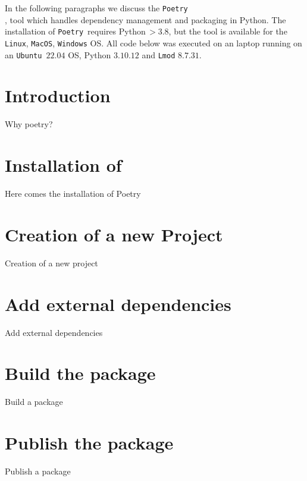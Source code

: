 \documentclass[10pt]{article}
\newcommand{\POETRY}{\texttt{Poetry}}
\begin{document}
\title{}
\author{Wim R.M. Cardoen \\ Email: \$(prefix)[at]gmail[dot]com \\ where \\ prefix='wcardoen' }
\date{\today}
\maketitle
\thispagestyle{empty}
\pagestyle{plain}
\setcounter{page}{1}
\renewcommand \thesection{\Roman{section}} 

In the following paragraphs we discuss the \POETRY\\,\cite{POETRY:2023} tool which handles
dependency management and packaging in Python.
The installation of \POETRY\ requires Python\,$>3.8$, but the tool is available for the \texttt{Linux},
\texttt{MacOS}, \texttt{Windows} OS.
All code below was executed on an laptop running on an \texttt{Ubuntu $22.04$} OS, Python $3.10.12$ 
and \texttt{Lmod} $8.7.31$.

\section*{Introduction}
Why poetry?

\section{Installation of }
Here comes the installation of Poetry

\section{Creation of a new Project}
Creation of a new project

\section{Add external dependencies}
Add external dependencies

\section{Build the package}
Build a package

\section{Publish the package}
Publish a package



\end{document}
